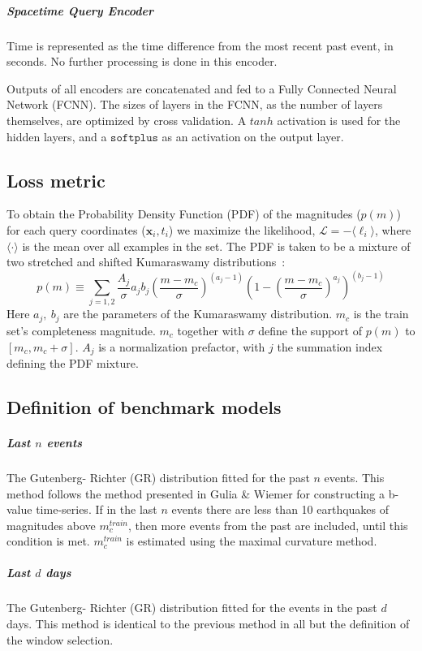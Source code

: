 \documentclass[pdflatex]{sn-jnl}
\begin{document}
\subparagraph{\textbf{Spacetime Query Encoder}} Time is represented as the time difference from the most recent past event, in seconds. No further processing is done in this encoder.

Outputs of all encoders are concatenated and fed to a Fully Connected Neural Network (FCNN). The sizes of layers in the FCNN, as the number of layers themselves, are optimized by cross validation. A $tanh$ activation is used for the hidden layers, and a $\texttt{softplus}$ as an activation on the output layer. 

\subsection{Loss metric}
To obtain the Probability Density Function (PDF) of the magnitudes ($p(m)$) for each query coordinates ($\textbf{x}_i, t_i$) we maximize the likelihood, $\mathcal{L} = -\langle \ell_i \rangle$, where $\langle \cdot\rangle$ is the mean over all examples in the set. The PDF is taken to be a mixture of two stretched and shifted Kumaraswamy distributions~\cite{kumaraswamy_generalized_1980}:
\begin{equation}
    p\left( m \right)
    \equiv
    \sum_{j=1,2} \frac{A_j}{\sigma}a_jb_j\left(\frac{m-m_c}{\sigma}\right)^{\left(a_j-1\right)}\left(1-\left(\frac{m-m_c}{\sigma}\right)^{a_j}\right)^{\left(b_j-1\right)}
\end{equation}
Here $a_j, \ b_j$ are the parameters of the Kumaraswamy distribution. $m_c$ is the train set's completeness magnitude. $m_c$ together with $\sigma$ define the support of $p(m)$ to $[m_c, m_c+\sigma]$. $A_j$ is a normalization prefactor, with $j$ the summation index defining the PDF mixture.

\subsection{Definition of benchmark models}
\subparagraph{Last $n$ events} The Gutenberg- Richter (GR) distribution fitted for the past $n$ events. This method follows the method presented in Gulia \& Wiemer\cite{gulia_real-time_2019} for constructing a b-value time-series. If in the last $n$ events there are less than 10 earthquakes of magnitudes above $m_c^{train}$, then more events from the past are included, until this condition is met. $m_c^{train}$ is estimated using the maximal curvature method\cite{wiemer_minimum_2000}.

\subparagraph{Last $d$ days} The Gutenberg- Richter (GR) distribution fitted for the events in the past $d$ days. This method is identical to the previous method in all but the definition of the window selection.
\end{document}
